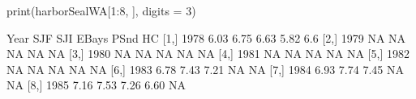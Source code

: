 \begin{Schunk}
\begin{Sinput}
 print(harborSealWA[1:8, ], digits = 3)
\end{Sinput}
\begin{Soutput}
     Year  SJF  SJI EBays PSnd  HC
[1,] 1978 6.03 6.75  6.63 5.82 6.6
[2,] 1979   NA   NA    NA   NA  NA
[3,] 1980   NA   NA    NA   NA  NA
[4,] 1981   NA   NA    NA   NA  NA
[5,] 1982   NA   NA    NA   NA  NA
[6,] 1983 6.78 7.43  7.21   NA  NA
[7,] 1984 6.93 7.74  7.45   NA  NA
[8,] 1985 7.16 7.53  7.26 6.60  NA
\end{Soutput}
\end{Schunk}

